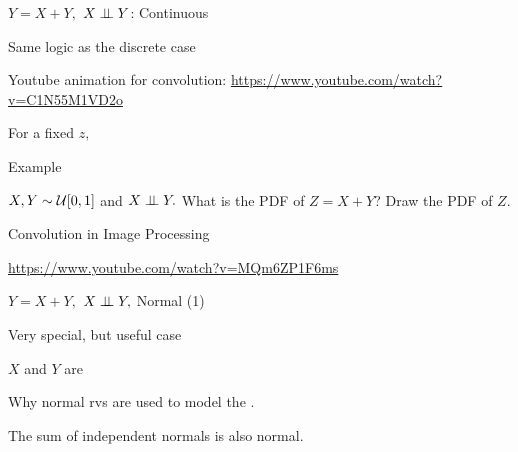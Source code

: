 \begin{frame}{$Y=X+Y,$ $X\perp \!\!\! \perp Y$: Continuous}

{

\plitemsep 0.07in
\bci

\item<1-> Same logic as the discrete case




\item<3-> Youtube animation for convolution:
\url{https://www.youtube.com/watch?v=C1N55M1VD2o}

\eci
}
{
For a fixed $z,$

}
\end{frame}


\begin{frame}{Example}

\plitemsep 0.1in
\bci

\item \exam $X,Y \sim \mathcal U[0,1]$ and $X \perp \!\!\! \perp Y.$ What is the PDF of $Z = X+Y$?
Draw the PDF of $Z$.


\eci
\end{frame}

\begin{frame}{Convolution in Image Processing}

\vspace{2cm}

{\large \url{https://www.youtube.com/watch?v=MQm6ZP1F6ms}}
\end{frame}


\begin{frame}{$Y=X+Y,$ $X\perp \!\!\! \perp Y,$ Normal (1)}


\plitemsep 0.1in
\bci

\item<1-> Very special, but useful case

\bci
\item $X$ and $Y$ are 
\eci

\bigskip
{}

\item<4->  Why normal rvs are used to model the .

\item<4->  The sum of  independent normals is also normal.
\eci

\end{frame}

